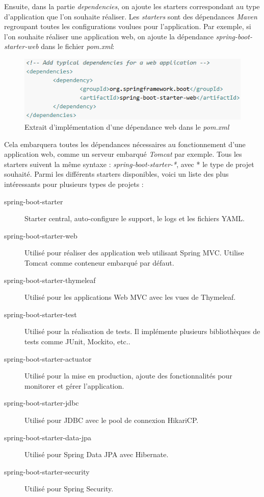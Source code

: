 \documentclass{polytech/polytech}
\begin{document}
Ensuite, dans la partie \textit{dependencies}, on ajoute les starters correspondant au type d’application que l’on souhaite réaliser. Les \textit{starters} sont des dépendances \textit{Maven} regroupant toutes les configurations voulues pour l’application.  Par exemple, si l'on souhaite réaliser une application web, on ajoute la dépendance \textit{spring-boot-starter-web} dans le fichier \textit{pom.xml}: 

\begin{figure}
	\includegraphics[scale=0.75]{images/dependencySpringBoot}
	\caption{Extrait d'implémentation d'une dépendance web dans le \textit{pom.xml}}
	\label{fig:dependencySpringBoot}
\end{figure}

Cela embarquera toutes les dépendances nécessaires au fonctionnement d'une application web, comme un serveur embarqué \textit{Tomcat} par exemple. Tous les starters suivent la même syntaxe : \textit{spring-boot-starter-*}, avec * le type de projet souhaité. Parmi les différents starters disponibles, voici un liste des plus intéressants pour plusieurs types de projets :

\begin{description}
	\item[spring-boot-starter] Starter central, auto-configure le support, le logs et les fichiers YAML.
	\item[spring-boot-starter-web] Utilisé pour réaliser des application web utilisant Spring MVC. Utilise Tomcat comme conteneur embarqué par défaut.
	\item[spring-boot-starter-thymeleaf] Utilisé pour les applications Web MVC avec les vues de Thymeleaf.
	\item[spring-boot-starter-test] Utilisé pour la réalisation de tests. Il implémente plusieurs bibliothèques de tests comme JUnit, Mockito, etc..
	\item[spring-boot-starter-actuator] Utilisé pour la mise en production, ajoute des fonctionnalités pour monitorer et gérer l’application. 
	\item[spring-boot-starter-jdbc] Utilisé pour JDBC avec le pool de connexion HikariCP.
	\item[spring-boot-starter-data-jpa] Utilisé pour Spring Data JPA avec Hibernate.
	\item[spring-boot-starter-security] Utilisé pour Spring Security.
\end{description}
\end{document}
